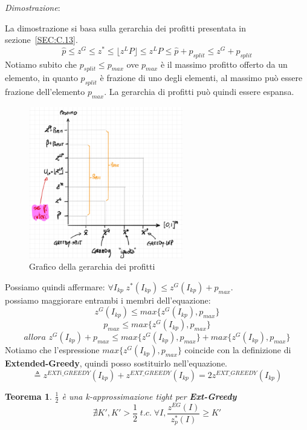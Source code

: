 \documentclass[a4paper]{article}
\newtheorem*{theorem}{Teorema}
\newenvironment{dimostrazione}{\textit{Dimostrazione}:\begin{adjustwidth}{1cm}{}}{\end{adjustwidth}}
\begin{document}
\begin{dimostrazione}
	La dimostrazione si basa sulla gerarchia dei profitti presentata in sezione~\ref{SEC:C.13}.\\
	$$\hat p \leq z^G \leq z^* \leq \lfloor z^LP \rfloor  \leq z^LP \leq \hat p + p_{split} \leq z^G + p_{split}$$
	Notiamo subito che $p_{split} \leq p_{max}$ ove $p_{max}$ è il massimo profitto offerto da un elemento, in quanto $p_{split}$ è frazione di uno degli elementi, al massimo può essere frazione dell'elemento $p_{max}$.
	La gerarchia di profitti può quindi essere espansa.\\
\begin{figure}[!ht]
\centering
\includegraphics[width=0.6\textwidth]{./img/C_13.png}
\caption{Grafico della gerarchia dei profitti} \label{FIG:C_13_2}
\end{figure}
Possiamo quindi affermare:
$\forall I_{kp} \; z^*(I_{kp}) \leq z^G(I_{kp}) + p_{max}$.\\
possiamo maggiorare entrambi i membri dell'equazione:
$$z^G(I_{kp}) \leq max\{z^G(I_{kp}), p_{max}\}$$
$$p_{max} \leq max\{z^G(I_{kp}), p_{max}\}$$
$$ \textit{allora } z^G(I_{kp}) + p_{max} \leq max\{z^G(I_{kp}), p_{max}\} + max\{z^G(I_{kp}), p_{max}\}$$
Notiamo che l'espressione $max\{z^G(I_{kp}), p_{max}\}$ coincide con la definizione di \textbf{Extended-Greedy}, quindi posso sostituirlo nell'equazione.
$$\triangleq z^{EXTi\_GREEDY}(I_{kp}) + z^{EXT\_GREEDY}(I_{kp}) = 2z^{EXT\_GREEDY}(I_{kp}) $$

\end{dimostrazione}
\begin{theorem} $\frac{1}{2}$ è una k-approssimazione tight per \textbf{Ext-Greedy}
	$$\nexists K', K' > \frac{1}{2} \; t.c. \; \forall I, \frac{z^{EG}(I)}{z^*_p(I)} \geq K'$$
\end{theorem}
\end{document}
